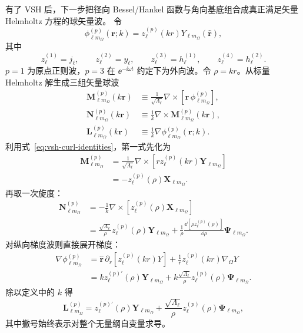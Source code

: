 有了 VSH 后，下一步把径向 Bessel/Hankel 函数与角向基底组合成真正满足矢量 Helmholtz 方程的球矢量波。
令
\begin{equation}
\phi_{\ell m_{\Omega}}^{(p)}(\bm r;k)
=z_\ell^{(p)}(kr)Y_{\ell m_{\Omega}}(\hat{\bm r}),
\label{eq:scalar-spherical-wave}
\end{equation}
其中
\begin{equation}
z_\ell^{(1)}=j_\ell,
\qquad
z_\ell^{(2)}=y_\ell,
\qquad
z_\ell^{(3)}=h_\ell^{(1)},
\qquad
z_\ell^{(4)}=h_\ell^{(2)}.
\end{equation}
$p=1$ 为原点正则波，$p=3$ 在 $\ee^{-\ii\omega t}$ 约定下为外向波。令
$\rho=kr$。从标量 Helmholtz 解生成三组矢量球波
\begin{align}
\bm M_{\ell m_{\Omega}}^{(p)}(k\bm r)
&\equiv
\frac{1}{\sqrt{\Lambda_\ell}}
\nabla\times\left[\bm r\,
\phi_{\ell m_{\Omega}}^{(p)}\right],
\\
\bm N_{\ell m_{\Omega}}^{(p)}(k\bm r)
&\equiv\frac{1}{k}\nabla\times
\bm M_{\ell m_{\Omega}}^{(p)}(k\bm r),
\\
\bm L_{\ell m_{\Omega}}^{(p)}(k\bm r)
&\equiv\frac{1}{k}\nabla
\phi_{\ell m_{\Omega}}^{(p)}(\bm r;k).
\label{eq:MNLG-def}
\end{align}
利用式~\eqref{eq:vsh-curl-identities}，第一式先化为
\begin{align}
\bm M_{\ell m_{\Omega}}^{(p)}
&=\frac{1}{\sqrt{\Lambda_\ell}}
\nabla\times
\left[r z_\ell^{(p)}(kr)\bm Y_{\ell m_{\Omega}}\right]
\\
&=-z_\ell^{(p)}(\rho)\bm X_{\ell m_{\Omega}}.
\label{eq:M-vsh-explicit}
\end{align}
再取一次旋度：
\begin{align}
\bm N_{\ell m_{\Omega}}^{(p)}
&=-\frac{1}{k}\nabla\times
\left[z_\ell^{(p)}(\rho)\bm X_{\ell m_{\Omega}}\right]
\\
&=\frac{\sqrt{\Lambda_\ell}}{\rho}
 z_\ell^{(p)}(\rho)\bm Y_{\ell m_{\Omega}}
+\frac{1}{\rho}
\frac{\dd[\rho z_\ell^{(p)}(\rho)]}{\dd\rho}
\bm\Psi_{\ell m_{\Omega}}.
\label{eq:N-vsh-explicit}
\end{align}
对纵向梯度波则直接展开梯度：
\begin{align}
\nabla\phi_{\ell m_\Omega}^{(p)}
&=\hat{\bm r}\,\partial_r[z_\ell^{(p)}(kr)Y]
+\frac{1}{r}z_\ell^{(p)}(kr)\nabla_\Omega Y\\
&=k z_\ell^{(p)\prime}(\rho)\bm Y_{\ell m_\Omega}
+k\frac{\sqrt{\Lambda_\ell}}{\rho}z_\ell^{(p)}(\rho)\bm\Psi_{\ell m_\Omega}.
\end{align}
除以定义中的 $k$ 得
\begin{equation}
\bm L_{\ell m_{\Omega}}^{(p)}
=z_\ell^{(p)\prime}(\rho)\bm Y_{\ell m_{\Omega}}
+\frac{\sqrt{\Lambda_\ell}}{\rho}
 z_\ell^{(p)}(\rho)\bm\Psi_{\ell m_{\Omega}},
\label{eq:L-vsh-explicit}
\end{equation}
其中撇号始终表示对整个无量纲自变量求导。

